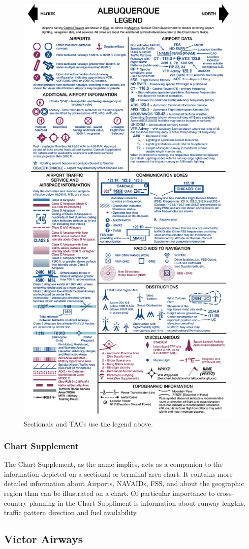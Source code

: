 \documentclass[12pt]{article}
\begin{document}
		\begin{figure}
			\centering
			\includegraphics[width=0.7\linewidth]{Figures/Sectional Legend.png}
			\caption{Sectionals and TACs use the legend above.}
		\end{figure}

		\subsubsection{Chart Supplement}
			The Chart Supplement, as the name implies, acts as a companion to the information depicted on a sectional or terminal area chart. It contains more detailed information about Airports, NAVAIDs, FSS, and about the geographic region than can be illustrated on a chart. Of particular importance to cross-country planning in the Chart Suppliment is information about runway lengths, traffic pattern direction and fuel availability.
	\subsection{Victor Airways}
\end{document}
